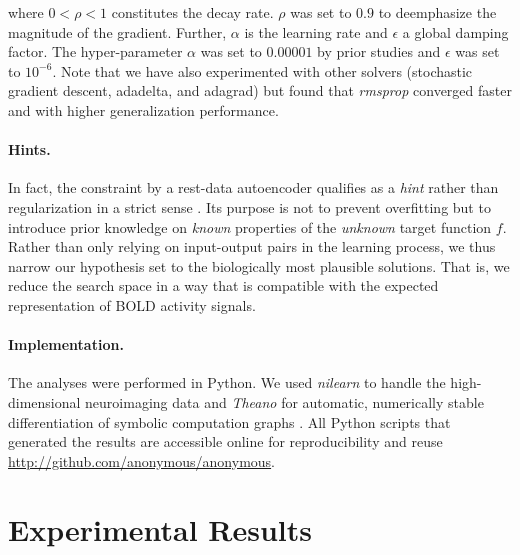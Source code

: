 \documentclass{article} %
\begin{document}
where $0 < \rho < 1$ constitutes the decay rate. $\rho$ was set to
$0.9$ to deemphasize the magnitude of the gradient.
Further, $\alpha$ is the learning rate and $\epsilon$ a global damping factor.
The hyper-parameter $\alpha$ was set to $0.00001$ by prior studies and $\epsilon$ was set to $10^{-6}$.
%
Note that we have also experimented with other solvers
(stochastic gradient descent, adadelta, and adagrad) but found that
\textit{rmsprop} converged faster and with higher generalization performance.

\paragraph{Hints.}
In fact, the constraint by a rest-data autoencoder qualifies as a
\textit{hint}
rather than regularization in a strict sense \cite{abu1994hints}.
Its purpose is not to prevent overfitting but to introduce
prior knowledge on
\textit{known} properties of the \textit{unknown} target function $f$.
Rather than only relying on input-output pairs in the learning process,
we thus narrow our hypothesis set to the biologically most plausible solutions.
That is, we reduce the search space in a way that
is compatible with the expected representation of BOLD activity signals.

\paragraph{Implementation.}
The analyses were performed in Python.
We used \textit{nilearn} to handle
the high-dimensional neuroimaging data 
\cite{abrah14}
and
\textit{Theano} for automatic, numerically stable
differentiation of symbolic computation graphs
\cite{bastien2012theano, bergstra2010theano}.
All Python scripts that generated the results are
accessible online for reproducibility and reuse
\url{http://github.com/anonymous/anonymous}.

\section{Experimental Results}
\end{document}
